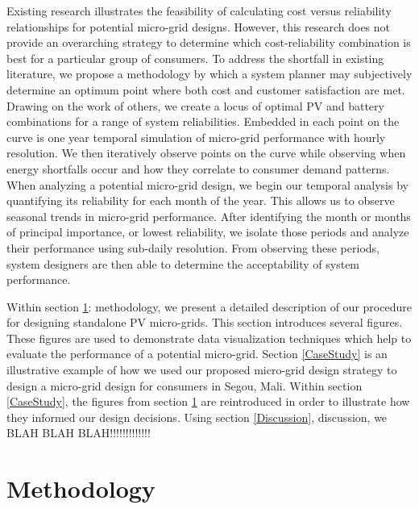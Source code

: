 \documentclass{article}
\begin{document}
Existing research illustrates the feasibility of calculating cost versus reliability relationships for potential micro-grid designs.
However, this research does not provide an overarching strategy to determine which cost-reliability combination is best for a particular group of consumers.  
To address the shortfall in existing literature, we propose a methodology by which a system planner may subjectively determine an optimum point where both cost and customer satisfaction are met.
Drawing on the work of others, we create a locus of optimal PV and battery combinations for a range of system reliabilities.
Embedded in each point on the curve is one year temporal simulation of micro-grid performance with hourly resolution.  
We then iteratively observe points on the curve while observing when energy shortfalls occur and how they correlate to consumer demand patterns.
When analyzing a potential micro-grid design, we begin our temporal analysis by quantifying its reliability for each month of the year. 
This allows us to observe seasonal trends in micro-grid performance. 
After identifying the month or months of principal importance, or lowest reliability, we isolate those periods and analyze their performance using sub-daily resolution. 
From observing these periods, system designers are then able to determine the acceptability of system performance.

Within section \ref{method}: methodology, we present a detailed description of our procedure for designing standalone PV micro-grids. 
This section introduces several figures.
These figures are used to demonstrate data visualization techniques which help to evaluate the performance of a potential micro-grid.  
Section \ref{CaseStudy} is an illustrative example of how we used our proposed micro-grid design strategy to design a micro-grid design for consumers in Segou, Mali. 
Within section \ref{CaseStudy}, the figures from section \ref{method} are reintroduced in order to illustrate how they informed our design decisions.
Using section \ref{Discussion}, discussion, we BLAH BLAH BLAH!!!!!!!!!!!!!


\section{Methodology} \label{method}

\end{document}
